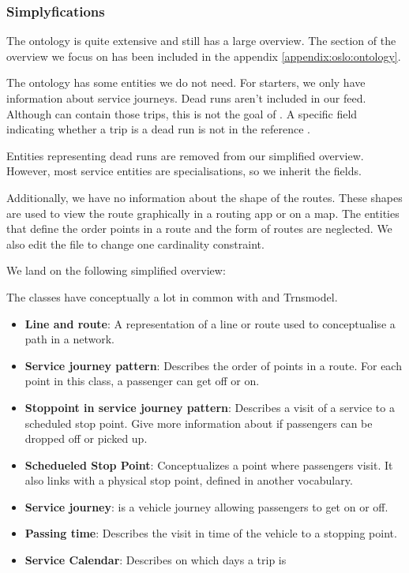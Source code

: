 \subsubsection{Simplyfications}
The ontology is quite extensive and still has a large overview. The section of the overview we focus on has been included in the appendix \ref{appendix:oslo:ontology}. 

The ontology has some entities we do not need. For starters, we only have information about service journeys. Dead runs aren't included in our feed. Although  can contain those trips, this is not the goal of . A specific field indicating whether a trip is a dead run is not in the reference \cite{noauthor_gtfs_2022}.

Entities representing dead runs are removed from our simplified overview. However, most service entities are specialisations, so we inherit the fields.

Additionally, we have no information about the shape of the routes. These shapes are used to view the route graphically in a routing app or on a map. The entities that define the order points in a route and the form of routes are neglected. We also edit the  file to change one cardinality constraint. 


We land on the following simplified overview:


The classes have conceptually a lot in common with  and Trnsmodel. 
\begin{itemize}
    \item \textbf{Line and route}: A representation of a line or route used to conceptualise a path in a network.
    \item \textbf{Service journey pattern}: Describes the order of points in a route. For each point in this class, a passenger can get off or on.
    \item \textbf{Stoppoint in service journey pattern}: Describes a visit of a service to a scheduled stop point. Give more information about if passengers can be dropped off or picked up.
    \item \textbf{Schedueled Stop Point}: Conceptualizes a point where passengers visit. It also links with a physical stop point, defined in another vocabulary.
    \item \textbf{Service journey}: is a vehicle journey allowing passengers to get on or off.
    \item \textbf{Passing time}: Describes the visit in time of the vehicle to a stopping point.
    \item \textbf{Service Calendar}: Describes on which days a trip is 
\end{itemize}

